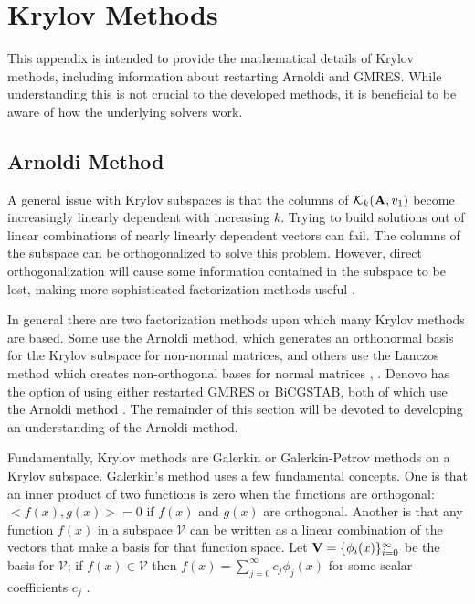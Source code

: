 
\chapter{Krylov Methods}
\label{sec:AppendixB}
This appendix is intended to provide the mathematical details of Krylov methods, including information about restarting Arnoldi and GMRES. While understanding this is not crucial to the developed methods, it is beneficial to be aware of how the underlying solvers work. 

\section{Arnoldi Method}
A general issue with Krylov subspaces is that the columns of $\mathcal{K}_{k}(\mathbf{A},v_{1})$ become increasingly linearly dependent with increasing $k$. Trying to build solutions out of linear combinations of nearly linearly dependent vectors can fail. The columns of the subspace can be orthogonalized to solve this problem. However, direct orthogonalization will cause some information contained in the subspace to be lost, making more sophisticated factorization methods useful \cite{Stewart2001}. 

In general there are two factorization methods upon which many Krylov methods are based. Some use the Arnoldi method, which generates an orthonormal basis for the Krylov subspace for non-normal matrices, and others use the Lanczos method which creates non-orthogonal bases for normal matrices \cite{Knoll2004}, \cite{Stewart2001}. Denovo has the option of using either restarted GMRES or BiCGSTAB, both of which use the Arnoldi method \cite{Evans2009}.  The remainder of this section will be devoted to developing an understanding of the Arnoldi method.

Fundamentally, Krylov methods are Galerkin or Galerkin-Petrov methods on a Krylov subspace. Galerkin's method uses a few fundamental concepts. One is that an inner product of two functions is zero when the functions are orthogonal: $<f(x), g(x)> = 0$ if $f(x)$ and $g(x)$ are orthogonal. Another is that any function $f(x)$ in a subspace $\mathcal{V}$ can be written as a linear combination of the vectors that make a basis for that function space. Let $\mathbf{V} = \{\phi_{i}(x) \}_{i=0}^{\infty}$ be the basis for $\mathcal{V}$; if $f(x) \in \mathcal{V}$ then $f(x) = \sum_{j=0}^{\infty} c_{j} \phi_{j}(x)$ for some scalar coefficients $c_{j}$ \cite{Matthews2005}.  

